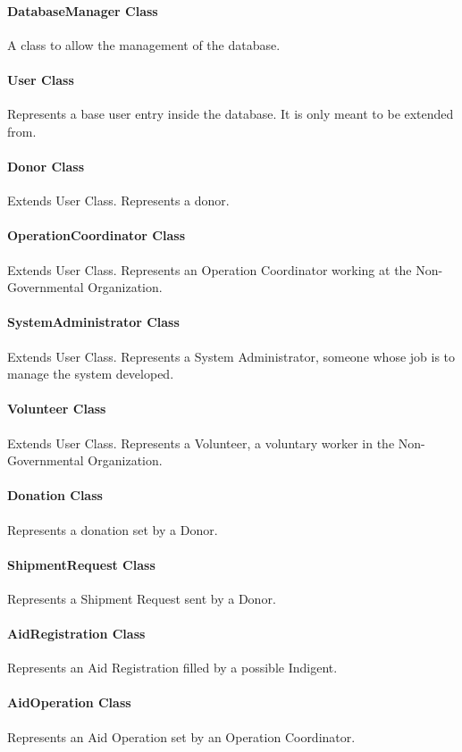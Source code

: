 \documentclass[a4paper,12pt]{report}
\begin{document}
			\paragraph{DatabaseManager Class}
			A class to allow the management of the database.
			\paragraph{User Class}
			Represents a base user entry inside the database. It is only meant to be extended from.
			\paragraph{Donor Class}
			Extends User Class. Represents a donor.
			\paragraph{OperationCoordinator Class}
			Extends User Class. Represents an Operation Coordinator working at the Non-Governmental Organization.
			\paragraph{SystemAdministrator Class}
			Extends User Class. Represents a System Administrator, someone whose job is to manage the system developed.
			\paragraph{Volunteer Class}
			Extends User Class. Represents a Volunteer, a voluntary worker in the Non-Governmental Organization.
			\paragraph{Donation Class}
			Represents a donation set by a Donor.
			\paragraph{ShipmentRequest Class}
			Represents a Shipment Request sent by a Donor.
			\paragraph{AidRegistration Class}
			Represents an Aid Registration filled by a possible Indigent.
			\paragraph{AidOperation Class}
			Represents an Aid Operation set by an Operation Coordinator.
\end{document}
